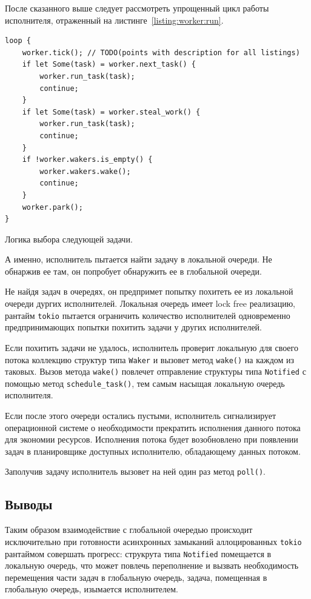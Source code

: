 После сказанного выше следует рассмотреть упрощенный цикл работы исполнителя, отраженный на листинге~\ref{listing:worker:run}.

\begin{listing}[H]
    \begin{verbatim}
loop {
    worker.tick(); // TODO(points with description for all listings)
    if let Some(task) = worker.next_task() {
        worker.run_task(task);
        continue;
    }
    if let Some(task) = worker.steal_work() {
        worker.run_task(task);
        continue;
    }
    if !worker.wakers.is_empty() {
        worker.wakers.wake();
        continue;
    }
    worker.park();
}
    \end{verbatim}

    \caption{Логика выбора следующей задачи.}
    \label{listing:worker:run}
\end{listing}

А именно, исполнитель пытается найти задачу в локальной очереди. Не обнаржив ее там, он попробует обнаружить ее в глобальной очереди.

Не найдя задач в очередях, он предпримет попытку похитеть ее из локальной очереди дургих исполнителей. Локальная очередь имеет lock free реализацию, рантайм \verb|tokio| пытается ограничить количество исполнителей одновременно предпринимающих попытки похитить задачи у других исполнителей.

Если похитить задачи не удалось, исполнитель проверит локальную для своего потока коллекцию структур типа \verb|Waker| и вызовет метод \verb|wake()| на каждом из таковых. Вызов метода \verb|wake()| повлечет отправление структуры типа \verb|Notified| с помощью метод \verb|schedule_task()|, тем самым насыщая локальную очередь исполнителя.

Если после этого очереди остались пустыми, исполнитель сигнализирует операционной системе о необходимости прекратить исполнения данного потока для экономии ресурсов. Исполнения потока будет возобновлено при появлении задач в планировщике доступных исполнителю, обладающему данных потоком.

Заполучив задачу исполнитель вызовет на ней один раз метод \verb|poll()|.

\subsection{Выводы}

Таким образом взаимодействие с глобальной очередью происходит исключительно при готовности асинхронных замыканий аллоцированных \verb|tokio| рантаймом совершать прогресс: струкрута типа \verb|Notified| помещается в локальную очередь, что может повлечь переполнение и вызвать необходимость перемещения части задач в глобальную очередь, задача, помещенная в глобальную очередь, изымается исполнителем.

